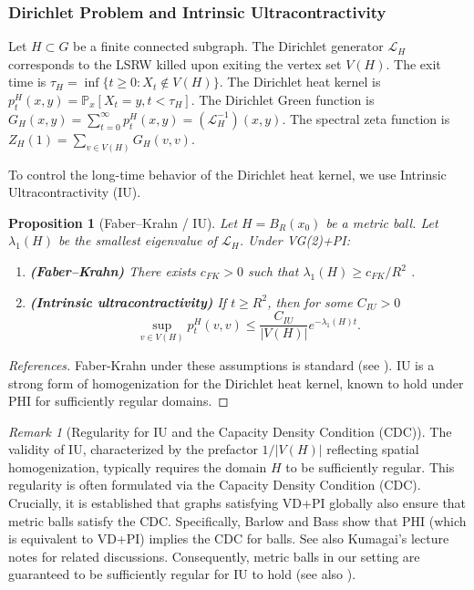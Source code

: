 \documentclass{article}
\numberwithin{equation}{section}
\newtheorem{proposition}[theorem]{Proposition}
\theoremstyle{definition}
\theoremstyle{remark}
\newtheorem{remark}[theorem]{Remark}
\newcommand{\LL}{\mathcal{L}} %
\newcommand{\Prob}{\mathbb{P}}
\begin{document}
\subsubsection{Dirichlet Problem and Intrinsic Ultracontractivity}
Let $H \subset G$ be a finite connected subgraph.
The Dirichlet generator $\LL_H$ corresponds to the LSRW killed upon exiting the vertex set $V(H)$. The exit time is $\tau_H = \inf\{t \geq 0 : X_t \notin V(H)\}$.
The Dirichlet heat kernel is $p_t^H(x,y) = \Prob_x[X_t = y, t < \tau_H]$. The Dirichlet Green function is $G_H(x,y) = \sum_{t=0}^{\infty} p_t^H(x,y) = (\LL_H^{-1})(x,y)$. The spectral zeta function is $Z_H(1) = \sum_{v \in V(H)} G_H(v,v)$.

To control the long-time behavior of the Dirichlet heat kernel, we use Intrinsic Ultracontractivity (IU).

\begin{proposition}[Faber--Krahn / IU]\label{prop:IU}
Let $H=B_R(x_0)$ be a metric ball. Let $\lambda_1(H)$ be the smallest eigenvalue of $\LL_H$. Under VG(2)+PI:
\begin{enumerate}
    \item \textbf{(Faber--Krahn)} There exists $c_{FK}>0$ such that $\lambda_1(H)\ge c_{FK}/R^{2}$ \cite[Prop.\,5.1]{BarlowBass04}.
    \item \textbf{(Intrinsic ultracontractivity)}
          If $t\ge R^{2}$, then for some $C_{IU}>0$
    \begin{equation}\label{eq:IU}
        \sup_{v \in V(H)} p_t^H(v,v) \leq \frac{C_{IU}}{|V(H)|} e^{-\lambda_1(H) t}.
    \end{equation}
\end{enumerate}
\end{proposition}
\begin{proof}[References]
Faber-Krahn under these assumptions is standard (see \cite{Grigoryan09}). IU is a strong form of homogenization for the Dirichlet heat kernel, known to hold under PHI for sufficiently regular domains.
\end{proof}


\begin{remark}[Regularity for IU and the Capacity Density Condition (CDC)]\label{rem:IU_regularity}
The validity of IU, characterized by the prefactor $1/|V(H)|$ reflecting spatial homogenization, typically requires the domain $H$ to be sufficiently regular. This regularity is often formulated via the Capacity Density Condition (CDC). Crucially, it is established that graphs satisfying VD+PI globally also ensure that metric balls satisfy the CDC.
Specifically, Barlow and Bass \cite[Proposition 3.5]{BarlowBass04} show that PHI (which is equivalent to VD+PI) implies the CDC for balls. See also Kumagai's lecture notes \cite{KumagaiNotes} for related discussions. Consequently, metric balls in our setting are guaranteed to be sufficiently regular for IU to hold (see also \cite{BassKumagai08}).
\end{remark}
\end{document}
